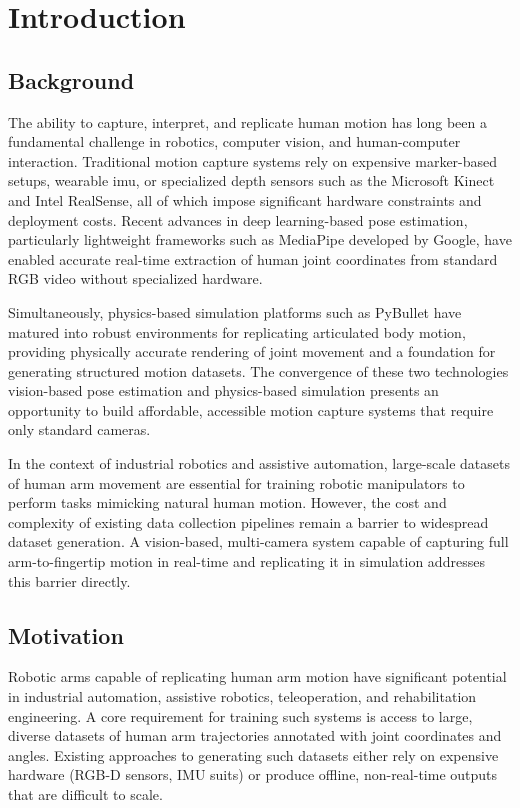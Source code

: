 \chapter[INTRODUCTION]{Introduction}

\section{Background}
The ability to capture, interpret, and replicate human motion has long been a fundamental challenge in robotics, computer vision, and human-computer interaction. Traditional motion capture systems rely on expensive marker-based setups, wearable \gls{imu}, or specialized depth sensors such as the Microsoft Kinect and Intel RealSense, all of which impose significant hardware constraints and deployment costs. Recent advances in deep learning-based pose estimation, particularly lightweight frameworks such as MediaPipe developed by Google, have enabled accurate real-time extraction of human joint coordinates from standard RGB video without specialized hardware.
 
Simultaneously, physics-based simulation platforms such as PyBullet have matured into robust environments for replicating articulated body motion, providing physically accurate rendering of joint movement and a foundation for generating structured motion datasets. The convergence of these two technologies vision-based pose estimation and physics-based simulation presents an opportunity to build affordable, accessible motion capture systems that require only standard cameras.
 
In the context of industrial robotics and assistive automation, large-scale datasets of human arm movement are essential for training robotic manipulators to perform tasks mimicking natural human motion. However, the cost and complexity of existing data collection pipelines remain a barrier to widespread dataset generation. A vision-based, multi-camera system capable of capturing full arm-to-fingertip motion in real-time and replicating it in simulation addresses this barrier directly.

\section{Motivation}
Robotic arms capable of replicating human arm motion have significant potential in industrial automation, assistive robotics, teleoperation, and rehabilitation engineering. A core requirement for training such systems is access to large, diverse datasets of human arm trajectories annotated with joint coordinates and angles. Existing approaches to generating such datasets either rely on expensive hardware (RGB-D sensors, IMU suits) or produce offline, non-real-time outputs that are difficult to scale.
 
